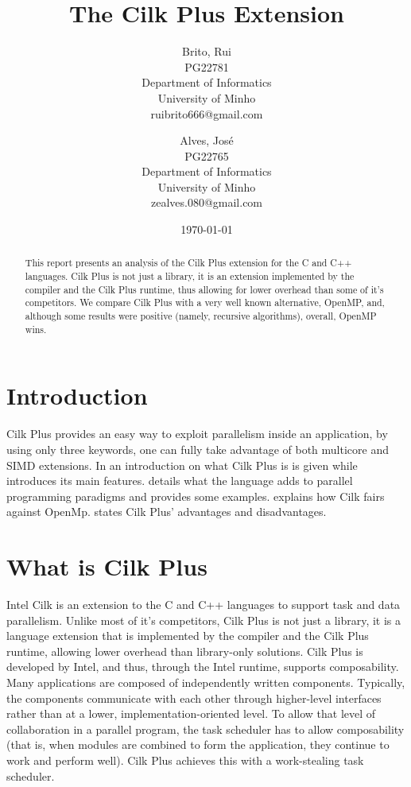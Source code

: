 \documentclass[a4paper,10pt,openright,openbib,twocolumn]{article}
\begin{document}
\title{The Cilk Plus Extension}
\date{\today}
\begin{multicols}{2}
\author{
    Brito, Rui\\
    PG22781\\
    Department of Informatics\\
    University of Minho\\
    ruibrito666@gmail.com
  \and
    Alves, José\\
    PG22765\\
    Department of Informatics\\
    University of Minho\\
    zealves.080@gmail.com
}
\date{}
\maketitle
\end{multicols}

\begin{abstract}
    This report presents an analysis of the Cilk Plus extension for the C and C++ languages. Cilk Plus is not just a library, it is an extension implemented by the compiler and the Cilk Plus runtime, thus allowing for lower overhead than some of it's competitors. We compare Cilk Plus with a very well known alternative, OpenMP, and, although some results were positive (namely, recursive algorithms), overall, OpenMP wins. 
\end{abstract}

\section{Introduction}   
    Cilk Plus provides an easy way to exploit parallelism inside an application, by using only three keywords, one can fully take advantage of both multicore and SIMD extensions. In  an introduction on what Cilk Plus is is given while  introduces its main features.  details what the language adds to parallel programming paradigms and provides some examples.  explains how Cilk fairs against OpenMp.  states Cilk Plus' advantages and disadvantages.


\section{What is Cilk Plus} \label{cilk}
Intel Cilk is an extension to the C and C++ languages to support task and data parallelism. Unlike most of it's competitors, Cilk Plus is not just a library, it is a language extension that is implemented by the compiler and the Cilk Plus runtime, allowing lower overhead than library-only solutions. Cilk Plus is developed by Intel, and thus, through the Intel runtime, supports composability. Many applications are composed of independently written components. Typically, the components communicate with each other through higher-level interfaces rather than at a lower, implementation-oriented level. To allow that level of collaboration in a parallel program, the task scheduler has to allow composability (that is, when modules are combined to form the application, they continue to work and perform well). Cilk Plus achieves this with a work-stealing task scheduler.
\end{document}
